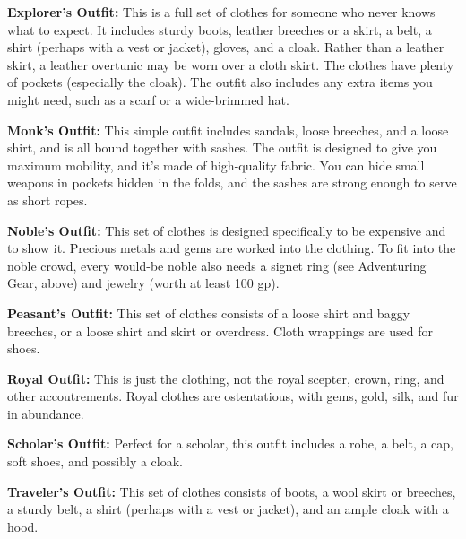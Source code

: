 \textbf{Explorer's Outfit:} This is a full set of clothes for someone who never 
knows what to expect. It includes sturdy boots, leather breeches or a skirt, a 
belt, a shirt (perhaps with a vest or jacket), gloves, and a cloak. Rather than 
a leather skirt, a leather overtunic may be worn over a cloth skirt. The clothes 
have plenty of pockets (especially the cloak). The outfit also includes any extra 
items you might need, such as a scarf or a wide-brimmed hat.

\textbf{Monk's Outfit:} This simple outfit includes sandals, loose breeches, and 
a loose shirt, and is all bound together with sashes. The outfit is designed to 
give you maximum mobility, and it's made of high-quality fabric. You can hide small 
weapons in pockets hidden in the folds, and the sashes are strong enough to serve 
as short ropes.

\textbf{Noble's Outfit:} This set of clothes is designed specifically to be expensive 
and to show it. Precious metals and gems are worked into the clothing. To fit into 
the noble crowd, every would-be noble also needs a signet ring (see Adventuring 
Gear, above) and jewelry (worth at least 100 gp).

\textbf{Peasant's Outfit:} This set of clothes consists of a loose shirt and baggy 
breeches, or a loose shirt and skirt or overdress. Cloth wrappings are used for 
shoes.

\textbf{Royal Outfit:} This is just the clothing, not the royal scepter, crown, 
ring, and other accoutrements. Royal clothes are ostentatious, with gems, gold, 
silk, and fur in abundance.

\textbf{Scholar's Outfit:} Perfect for a scholar, this outfit includes a robe, 
a belt, a cap, soft shoes, and possibly a cloak.

\textbf{Traveler's Outfit:} This set of clothes consists of boots, a wool skirt 
or breeches, a sturdy belt, a shirt (perhaps with a vest or jacket), and an ample 
cloak with a hood.